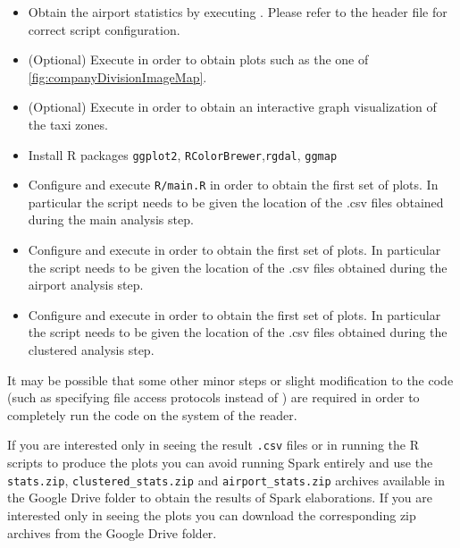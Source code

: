 \documentclass{acm_proc_article-sp-sigmod09}
\begin{document}
\begin{itemize}
	\item Obtain the airport statistics by executing . Please refer to the header file for correct script configuration.
	\item (Optional) Execute  in order to obtain plots such as the one of \cref{fig:companyDivisionImageMap}.
	\item (Optional) Execute  in order to obtain an interactive graph visualization of the taxi zones.
	\item Install R packages \texttt{ggplot2}, \texttt{RColorBrewer},\texttt{rgdal}, \texttt{ggmap}
	\item Configure and execute \texttt{R/main.R} in order to obtain the first set of plots. In particular the script needs to be given the location of the .csv files obtained during the main analysis step.
	\item Configure and execute  in order to obtain the first set of plots. In particular the script needs to be given the location of the .csv files obtained during the airport analysis step.
	\item Configure and execute  in order to obtain the first set of plots. In particular the script needs to be given the location of the .csv files obtained during the clustered analysis step.
\end{itemize}

It may be possible that some other minor steps or slight modification to the code (such as specifying file access protocols  instead of ) are required in order to completely run the code on the system of the reader.

If you are interested only in seeing the result \texttt{.csv} files or in running the R scripts to produce the plots you can avoid running Spark entirely and use the \texttt{stats.zip}, \texttt{clustered\_stats.zip} and \texttt{airport\_stats.zip} archives available in the Google Drive folder to obtain the results of Spark elaborations. If you are interested only in seeing the plots you can download the corresponding zip archives from the Google Drive folder.
\end{document}
